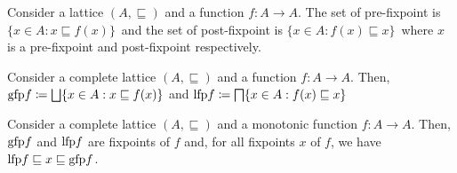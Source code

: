 





\begin{definition}
    Consider a lattice $(A, \sqsubseteq)$ and a function $f \colon A \to A$. 
	The set of pre-fixpoint is $\{ x \in A : x \sqsubseteq f(x) \} \,$ and the set of post-fixpoint is $\{ x \in A : f(x) \sqsubseteq x \} \,$  where $x$ is a pre-fixpoint and post-fixpoint respectively.
\end{definition}


\begin{definition}
    Consider a complete lattice $(A, \sqsubseteq)$ and a function $f \colon A \to A$. 
	Then, $\mathrm{gfp} f \coloneqq \bigsqcup \{ x \in A : x \sqsubseteq f(x) \}$ and $\mathrm{lfp} f \coloneqq \bigsqcap \{ x \in A : f(x) \sqsubseteq x \}$
\end{definition}



\begin{theorem}
    Consider a complete lattice $(A, \sqsubseteq)$ and a monotonic function $f \colon A \to A$.
	Then, $\mathrm{gfp} f$ and $\mathrm{lfp} f$ are fixpoints of $f$ and, for all fixpoints $x$ of $f$, we have $\mathrm{lfp} f \sqsubseteq x \sqsubseteq \mathrm{gfp} f$.
\end{theorem}

